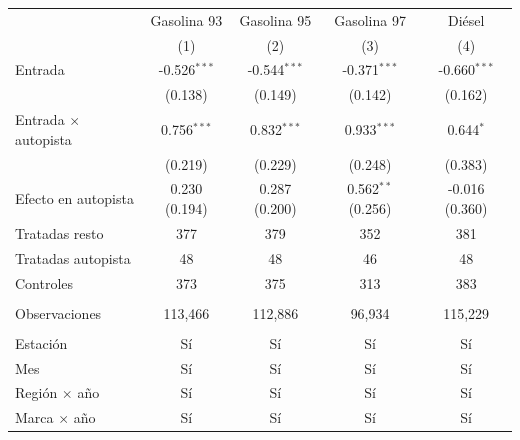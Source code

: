 
\begingroup
\centering
\begin{tabular}{lcccc}
   \toprule
                               & Gasolina 93    & Gasolina 95    & Gasolina 97          & Diésel \\   
                               & (1)            & (2)            & (3)                  & (4)\\  
   \midrule 
   Entrada                     & -0.526$^{***}$ & -0.544$^{***}$ & -0.371$^{***}$       & -0.660$^{***}$\\   
                               & (0.138)        & (0.149)        & (0.142)              & (0.162)\\   
   Entrada $\times$ autopista  & 0.756$^{***}$  & 0.832$^{***}$  & 0.933$^{***}$        & 0.644$^{*}$\\   
                               & (0.219)        & (0.229)        & (0.248)              & (0.383)\\   
   Efecto en autopista         & 0.230 (0.194)  & 0.287 (0.200)  & 0.562$^{**}$ (0.256) & -0.016 (0.360)\\  
   Tratadas resto              & 377            & 379            & 352                  & 381\\  
   Tratadas autopista          & 48             & 48             & 46                   & 48\\  
   Controles                   & 373            & 375            & 313                  & 383\\  
    \\
   Observaciones               & 113,466        & 112,886        & 96,934               & 115,229\\  
    \\
   Estación                    & Sí             & Sí             & Sí                   & Sí\\  
   Mes                         & Sí             & Sí             & Sí                   & Sí\\  
   Región $\times$ año         & Sí             & Sí             & Sí                   & Sí\\  
   Marca $\times$ año          & Sí             & Sí             & Sí                   & Sí\\  
   \bottomrule
\end{tabular}
\par\endgroup


